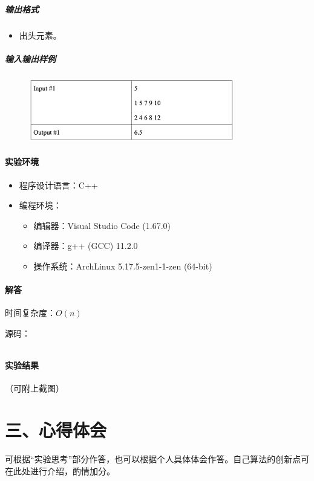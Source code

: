 \documentclass[12pt,a4paper]{ctexart}
\begin{document}
\subparagraph{输出格式}
    \begin{itemize}
        \item 出头元素。
    \end{itemize}
    

\subparagraph{输入输出样例}
    \begin{figure}[h]
        \centering
        \includegraphics[width=0.80\textwidth]{q3_iodata.png}
    \end{figure}

\vspace{5pt}

\paragraph{实验环境}
\begin{itemize}
    \item 程序设计语言：C++
    \item 编程环境：
    \begin{itemize}
        \item 编辑器：Visual Studio Code (1.67.0)
        \item 编译器：g++ (GCC) 11.2.0
        \item 操作系统：ArchLinux 5.17.5-zen1-1-zen (64-bit)
    \end{itemize}
\end{itemize}

\vspace{5pt}

\paragraph{解答} 时间复杂度：$O(n)$

源码：
\inputminted[bgcolor=codebg,frame=lines,autogobble,linenos=true,breaklines]{cpp}{src/t3.cpp}

\vspace{5pt}

\paragraph{实验结果}
（可附上截图）

\newpage

\section*{三、心得体会}
    可根据“实验思考”部分作答，也可以根据个人具体体会作答。自己算法的创新点可在此处进行介绍，酌情加分。
\end{document}
